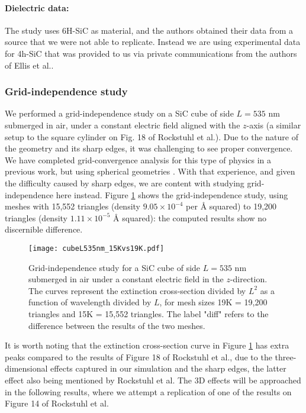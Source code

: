 \paragraph{Dielectric data:} The study uses 6H-SiC as material, and the authors obtained their data from a source that we
were not able to replicate. Instead we are using experimental data for 4h-SiC that was provided to us 
via private communications from the authors of Ellis et al.\cite{ellis2016}.  

\subsubsection{Grid-independence study}\label{sec:independence}

We performed a grid-independence study on a SiC cube of side $L=535$ nm submerged in air, under a 
constant electric field aligned with the $z$-axis (a similar setup to the square cylinder on Fig. 18 of 
Rockstuhl et al.\cite{rockstuhl2005}). 
Due to the nature of the geometry and its sharp edges, it was challenging to see proper convergence. 
We have completed grid-convergence analysis for this type of physics in a previous work, but using spherical geometries \cite{ClementiETal2019}. 
With that experience, and given the difficulty caused by sharp edges, we are content with studying grid-independence here instead.
Figure \ref{fig:cube535} shows the grid-independence study, using meshes with  15,552 triangles (density $9.05\times10^{-4}$ per $\text{\AA}$ squared)
 to 19,200 triangles (density $1.11\times10^{-5}$ $\text{\AA}$ squared):
 the computed results show no discernible difference.

\begin{figure}
    \centering
    \texttt{[image: cubeL535nm\_15Kvs19K.pdf]} 
    \caption{Grid-independence study for a SiC cube of side $L=535$ nm submerged in air under a constant 
    electric field in the $z$-direction. The curves represent the extinction cross-section divided by $L^2$ 
    as a function of wavelength divided by $L$, for mesh sizes 19K = 19,200 triangles and 15K = 15,552 triangles. 
    The label "diff" refers to the difference between the results of the two meshes.}
    \label{fig:cube535}
 \end{figure}

It is worth noting that the extinction cross-section curve in Figure \ref{fig:cube535} has extra peaks 
compared to the results of Figure 18 of Rockstuhl et al., due to the three-dimensional effects captured in our simulation and the sharp 
edges, the latter effect also being mentioned by Rockstuhl et al. The 3D effects will be approached
in the following results, where we attempt a replication of one of the results on Figure 14 of Rockstuhl et al. 

